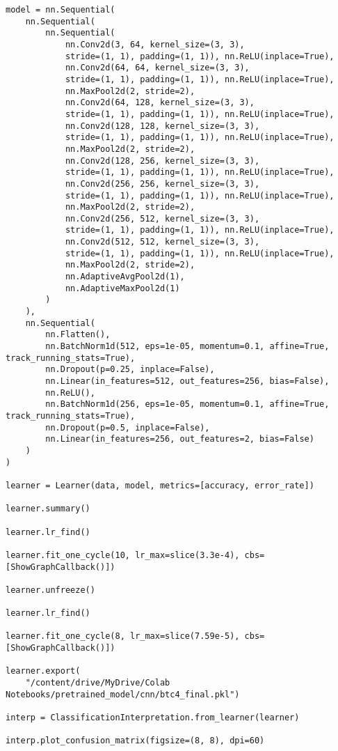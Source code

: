 \begin{verbatim}
model = nn.Sequential(
    nn.Sequential(
        nn.Sequential(
            nn.Conv2d(3, 64, kernel_size=(3, 3),
			stride=(1, 1), padding=(1, 1)), nn.ReLU(inplace=True),
            nn.Conv2d(64, 64, kernel_size=(3, 3),
			stride=(1, 1), padding=(1, 1)), nn.ReLU(inplace=True),
            nn.MaxPool2d(2, stride=2),
            nn.Conv2d(64, 128, kernel_size=(3, 3),
			stride=(1, 1), padding=(1, 1)), nn.ReLU(inplace=True),
            nn.Conv2d(128, 128, kernel_size=(3, 3),
			stride=(1, 1), padding=(1, 1)), nn.ReLU(inplace=True),
            nn.MaxPool2d(2, stride=2),
            nn.Conv2d(128, 256, kernel_size=(3, 3),
			stride=(1, 1), padding=(1, 1)), nn.ReLU(inplace=True),
            nn.Conv2d(256, 256, kernel_size=(3, 3),
			stride=(1, 1), padding=(1, 1)), nn.ReLU(inplace=True),
            nn.MaxPool2d(2, stride=2),
            nn.Conv2d(256, 512, kernel_size=(3, 3),
			stride=(1, 1), padding=(1, 1)), nn.ReLU(inplace=True),
            nn.Conv2d(512, 512, kernel_size=(3, 3),
			stride=(1, 1), padding=(1, 1)), nn.ReLU(inplace=True),
            nn.MaxPool2d(2, stride=2),
            nn.AdaptiveAvgPool2d(1),
            nn.AdaptiveMaxPool2d(1)
        )
    ),
    nn.Sequential(
        nn.Flatten(),
        nn.BatchNorm1d(512, eps=1e-05, momentum=0.1, affine=True, track_running_stats=True),
        nn.Dropout(p=0.25, inplace=False),
        nn.Linear(in_features=512, out_features=256, bias=False),
        nn.ReLU(),
        nn.BatchNorm1d(256, eps=1e-05, momentum=0.1, affine=True, track_running_stats=True),
        nn.Dropout(p=0.5, inplace=False),
        nn.Linear(in_features=256, out_features=2, bias=False)
    )
)

learner = Learner(data, model, metrics=[accuracy, error_rate])

learner.summary()

learner.lr_find()

learner.fit_one_cycle(10, lr_max=slice(3.3e-4), cbs=[ShowGraphCallback()])

learner.unfreeze()

learner.lr_find()

learner.fit_one_cycle(8, lr_max=slice(7.59e-5), cbs=[ShowGraphCallback()])

learner.export(
    "/content/drive/MyDrive/Colab Notebooks/pretrained_model/cnn/btc4_final.pkl")

interp = ClassificationInterpretation.from_learner(learner)

interp.plot_confusion_matrix(figsize=(8, 8), dpi=60)
\end{verbatim}
